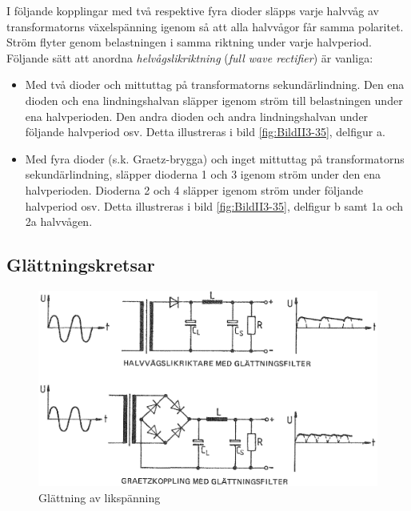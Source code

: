 I följande kopplingar med två respektive fyra dioder släpps varje halvvåg av
transformatorns växelspänning igenom så att alla halvvågor får samma polaritet.
Ström flyter genom belastningen i samma riktning under varje halvperiod.
Följande sätt att anordna \emph{helvågslikriktning}
(\emph{full wave rectifier}) är vanliga:
\begin{itemize}
\item Med två dioder och mittuttag på transformatorns sekundärlindning.
  Den ena dioden och ena lindningshalvan släpper igenom ström till belastningen
  under ena halvperioden.
  Den andra dioden och andra lindningshalvan under följande halvperiod osv.
  Detta illustreras i bild \ref{fig:BildII3-35}, delfigur a.

\item Med fyra dioder (s.k. Graetz-brygga) och inget mittuttag på
  transformatorns sekundärlindning, släpper dioderna 1 och 3 igenom
  ström under den ena halvperioden.
  Dioderna 2 och 4 släpper igenom ström under följande halvperiod osv.
  Detta illustreras i bild \ref{fig:BildII3-35}, delfigur b samt 1a och 2a
  halvvågen.
\end{itemize}

\subsection{Glättningskretsar}

\begin{figure}
\includegraphics[width=\textwidth]{images/cropped_pdfs/bild_2_3-36.pdf}
\caption{Glättning av likspänning}
\label{fig:BildII3-36}
\end{figure}

